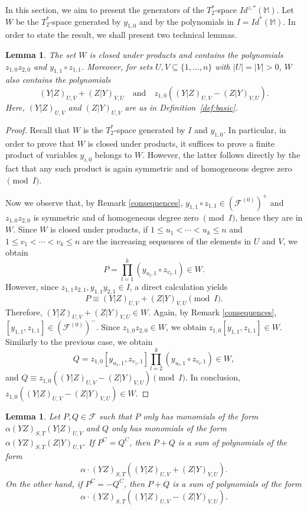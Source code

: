 \documentclass[11pt]{amsart}
\newtheorem{lemma}[theorem]{Lemma}
\theoremstyle{definition}
\theoremstyle{remark}
\begin{document}
	In this section, we aim to present the generators of the $T_2^*$-space $Id^{z,*}(\mathbb M)$. Let $W$ be the $T_2^*$-space generated by $y_{1, 0}$ and by the polynomials in $I=Id^*(\mathbb M)$.
	In order to state the result, we shall present two technical lemmas.
	
	\begin{lemma}\label{lem:aux}
		The set $W$ is closed under products and contains the polynomials $z_{1, 0}z_{2, 0}$ and $y_{1,1}\circ z_{1, 1}$. Moreover, for sets $U, V\subseteq \{1, \ldots, n\}$ with $|U|=|V|>0$, $W$ also contains the polynomials
		$$(Y|Z)_{U, V}+(Z|Y)_{V, U}\quad\text{and}\quad z_{1, 0}\left( (Y| Z)_{U, V}-(Z|Y)_{V, U}\right).$$
		Here, $(Y| Z)_{U, V}$ and $(Z|Y)_{U, V}$ are as in Definition~\ref{def:basic}.
	\end{lemma}
	
	\begin{proof}
		Recall that $W$ is the $T_2^*$-space generated by $I$ and $y_{1, 0}$. In particular, in order to prove that $W$ is closed under products, it suffices to prove a finite product of variables $y_{i, 0}$ belongs to $W$. However, the latter follows directly by the fact that any such product is again symmetric and of homogeneous degree zero $\pmod I$. 
		
		
		Now we observe that, by Remark \ref{consequences}, $y_{1, 1}\circ z_{1, 1}\in (\mathcal{F}^{(0)})^+$ and $z_{1, 0}z_{2, 0}$ is symmetric and of homogeneous degree zero $\pmod{I}$, hence they are in $W$. Since $W$ is closed under products, if $1\le u_1<\cdots<u_k\le n$ and $1\le v_1<\cdots <v_k\le n$ are the increasing sequences of the elements in $U$ and $V$, we obtain 
		$$P=\prod_{l=1}^k(y_{u_l, 1}\circ z_{v_l, 1})\in W.$$
		However, since $z_{1, 1}z_{2, 1}, y_{1, 1}y_{2, 1}\in I$, a direct calculation yields 
		$$P\equiv (Y|Z)_{U, V}+(Z|Y)_{V, U}\pmod I.$$
		Therefore, $(Y|Z)_{U, V}+(Z|Y)_{V, U}\in W$. 
		Again, by Remark \ref{consequences}, $[y_{1, 1},z_{1, 1}]\in (\mathcal{F}^{(0)})^-$. Since $z_{1, 0}z_{2, 0}\in W$, we obtain 
		$z_{1, 0}[y_{1, 1},z_{1, 1}]\in W$.  Similarly to the previous case, we obtain 
		$$Q=z_{1, 0}[y_{u_1, 1},z_{v_1, 1}]\prod_{l=2}^k(y_{u_l, 1}\circ z_{v_l, 1})\in W,$$
		and $Q\equiv z_{1, 0}((Y|Z)_{U, V}-(Z|Y)_{V, U})\pmod I$. In conclusion, $z_{1, 0}((Y|Z)_{U, V}-(Z|Y)_{V, U})\in W$. 
	\end{proof}

    \begin{lemma}\label{lem:sum}
    Let $P, Q\in \mathcal{F}$ such that $P$ only has monomials of the form $\alpha (YZ)_{S, T}(Y|Z)_{U, V}$ and $Q$ only has monomials of the form $\alpha (YZ)_{S, T}(Z|Y)_{U, V}$. If $P^C=Q^C$, then $P+Q$ is a sum of polynomials of the form 
    $$\alpha\cdot  (YZ)_{S, T}((Y|Z)_{U, V}+(Z|Y)_{V, U}).$$
    On the other hand, if $P^C=-Q^C$, then $P+Q$ is a sum of polynomials of the form 
    $$\alpha\cdot  (YZ)_{S, T}((Y|Z)_{U, V}-(Z|Y)_{V, U}).$$    
\end{lemma}
\end{document}
